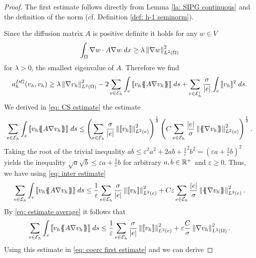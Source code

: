 \begin{proof}
	The first estimate follows directly from Lemma \ref{la: SIPG continuous} and the definition of the norm (cf. Definition \ref{def: h-1 seminorm}). 
		
	Since the diffusion matrix $A$ is positive definite it holds for any $w \in V$
	\begin{align}
	\int_{\Omega} {{\nabla w \cdot A \nabla w}\;dx} \geq \lambda \left\lVert \nabla w  \right\rVert_{L^2(\Omega)}^2  \label{eq: estimate pos def}
	\end{align}
	for $\lambda >0$, the smallest eigenvalue of $A$.
	Therefore we find
	\begin{align}
	a_h^{DG}(v_h,v_h) \geq \lambda \left\lVert \nabla v_h \right\rVert_{L^2(\Omega)}^2 - 2 \sum\limits_{e \in \mathcal{E}_h}\int_{e} {{ \llbracket v_h \{\!\!\{ A \nabla v_h \}\!\!\}  \rrbracket}\;ds} + \sum_{e\in \mathcal{E}_h^i} \frac \sigma {|e|} \int_{e} {{\llbracket v_h \rrbracket^2}\;ds} .\label{eq: coerc first estimate}
	\end{align}
	We derived in \eqref{eq: CS estimate} the estimate 
	\begin{align}
	\sum\limits_{e \in \edges}\myIntS e { \jump {v_h \average{A \nabla v_h} }}
	\leq		\left( \sum\limits_{e \in \edges} \frac {\sigma}{|e|} \LTwonormE{\jump {v_h}}^2 \right)^{\frac 1 2}
	\left(C \sum\limits_{e \in \edges} \frac {|e|} \sigma \LTwonormE{\average{\nabla v_h}}^2 \right)^{\frac 1 2}. \label{eq: inter estimate}
	\end{align}
	Taking the root of the trivial inequality $ab \leq \varepsilon^2 a^2 + 2ab + {\frac 1 \varepsilon}^2b^2 = \left( \varepsilon a + \frac 1 \varepsilon b\right)^2$ yields the inequality $\sqrt{a} \sqrt{b} \leq \varepsilon a + \frac 1 \varepsilon b$ for arbitrary $a,b \in \mathbb{R}^+$ and $\varepsilon \geq 0$. Thus, we have using \eqref{eq: inter estimate}
	\begin{align*}
	\sum\limits_{e \in \edges}\myIntS e { \jump {v_h \average{A \nabla v_h} }} 
	\leq \frac 1 \varepsilon \sum\limits_{e \in \edges}\frac \sigma {|e|}\LTwonormE{\jump {v_h}}^2 
	+ C\varepsilon  \sum\limits_{e \in \edges}  \frac {|e|} \sigma \LTwonormE{\average{\nabla v_h}}^2.
	\end{align*}
	By \eqref{eq: estimate average} it follows that 
	\begin{align*}
		\sum\limits_{e \in \mathcal{E}_h}\int_{e} {{ \llbracket v_h \{\!\!\{ A \nabla v_h \}\!\!\}  \rrbracket}\;ds} 
		\leq \frac 1 \varepsilon \sum\limits_{e \in \mathcal{E}_h}\frac \sigma {|e|}\left\lVert \llbracket v_h \rrbracket \right\rVert_{L^2(e)}^2 
		+ \varepsilon  \frac C \sigma \left\lVert \nabla v_h \right\rVert_{L^2(\Omega)}^2.
	\end{align*}			
	Using this estimate in \eqref{eq: coerc first estimate} and we can derive

\end{proof}
